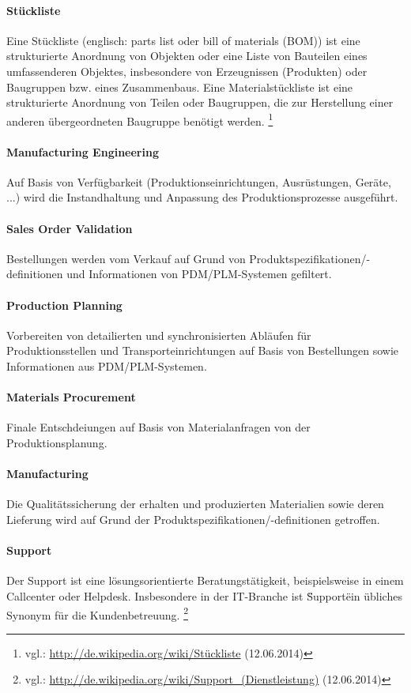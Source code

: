 \paragraph{Stückliste}
Eine Stückliste (englisch: parts list oder bill of materials (BOM)) ist eine strukturierte Anordnung von Objekten oder eine Liste von Bauteilen eines umfassenderen Objektes, insbesondere von Erzeugnissen (Produkten) oder Baugruppen bzw. eines Zusammenbaus. Eine Materialstückliste ist eine strukturierte Anordnung von Teilen oder Baugruppen, die zur Herstellung einer anderen übergeordneten Baugruppe benötigt werden. \footnote{vgl.: \url{http://de.wikipedia.org/wiki/Stückliste} (12.06.2014)}

\paragraph{Manufacturing Engineering}
Auf Basis von Verfügbarkeit (Produktionseinrichtungen, Ausrüstungen, Geräte, ...) wird die Instandhaltung und Anpassung des Produktionsprozesse ausgeführt.

\paragraph{Sales Order Validation}
Bestellungen werden vom Verkauf auf Grund von Produktspezifikationen/- definitionen und Informationen von PDM/PLM-Systemen gefiltert.

\paragraph{Production Planning}
Vorbereiten von detailierten und synchronisierten Abläufen für Produktionsstellen und Transporteinrichtungen auf Basis von Bestellungen sowie Informationen aus PDM/PLM-Systemen.

\paragraph{Materials Procurement}
Finale Entschdeiungen auf Basis von Materialanfragen von der Produktionsplanung.

\paragraph{Manufacturing}
Die Qualitätssicherung der erhalten und produzierten Materialien sowie deren Lieferung wird auf Grund der Produktspezifikationen/-definitionen getroffen.

\paragraph{Support}
Der Support ist eine lösungsorientierte Beratungstätigkeit, beispielsweise in einem Callcenter oder Helpdesk. Insbesondere in der IT-Branche ist \"Support\" ein übliches Synonym für die Kundenbetreuung. \footnote{vgl.: \url{http://de.wikipedia.org/wiki/Support_(Dienstleistung)} (12.06.2014)}

